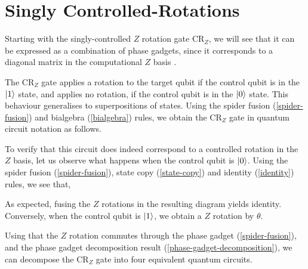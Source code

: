 \section{Singly Controlled-Rotations}

Starting with the singly-controlled $Z$ rotation gate CR$_Z$, we will see that it can be expressed as a combination of phase gadgets, since it corresponds to a diagonal matrix in the computational $Z$ basis \cite{Yeung2020}.


The CR$_Z$ gate applies a rotation to the target qubit if the control qubit is in the $\ket 1$ state, and applies no rotation, if the control qubit is in the $\ket 0$ state. This behaviour generalises to superpositions of states. Using the spider fusion (\ref{spider-fusion}) and bialgebra (\ref{bialgebra}) rules, we obtain the CR$_Z$ gate in quantum circuit notation as follows.


To verify that this circuit does indeed correspond to a controlled rotation in the $Z$ basis, let us observe what happens when the control qubit is $\ket 0$. Using the spider fusion (\ref{spider-fusion}), state copy (\ref{state-copy}) and identity (\ref{identity}) rules, we see that,


As expected, fusing the $Z$ rotations in the resulting diagram yields identity. Conversely, when the control qubit is $\ket 1$, we obtain a $Z$ rotation by $\theta$.


Using that the $Z$ rotation commutes through the phase gadget (\ref{spider-fusion}), and the phase gadget decomposition result (\ref{phase-gadget-decomposition}), we can decompose the CR$_Z$ gate into four equivalent quantum circuits.

